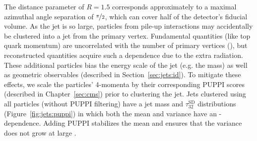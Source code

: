 The distance parameter of $R=1.5$ corresponds approximately to a maximal azimuthal angle separation of $\nicefrac{\pi}{2}$, which can cover half of the detector's fiducial volume.
As the jet is so large, particles from pile-up interactions may accidentally be clustered into a jet from the primary vertex.
Fundamental quantities (like top quark momentum) are uncorrelated with the number of primary vertices (\NPV), but reconstructed quantities acquire such a dependence due to the extra radiation.
These additional particles bias the energy scale of the jet (e.g. the mass) as well as geometric observables (described in Section~\ref{sec:jets:id}).
To mitigate these effects, we scale the particles' 4-momenta by their corresponding PUPPI scores (described in Chapter~\ref{sec:cms}) prior to clustering the jet.
Jets clustered using all particles (without PUPPI filtering) have a jet mass and $\tau_{32}^\mathrm{SD}$ distributions (Figure~\ref{fig:jets:puppi}) in which both the mean and variance have an \NPV-dependence.
Adding PUPPI stabilizes the mean and ensures that the variance does not grow at large \NPV.

